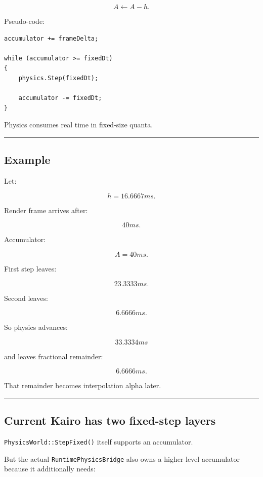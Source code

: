 \[
A\leftarrow A-h.
\]

Pseudo-code:

\begin{verbatim}
accumulator += frameDelta;

while (accumulator >= fixedDt)
{
    physics.Step(fixedDt);

    accumulator -= fixedDt;
}
\end{verbatim}

Physics consumes real time in fixed-size quanta.

\begin{center}\rule{0.5\linewidth}{0.5pt}\end{center}

\subsection{Example}\label{06-engine-ii-ch037-example}

Let:

\[
h=16.6667ms.
\]

Render frame arrives after:

\[
40ms.
\]

Accumulator:

\[
A=40ms.
\]

First step leaves:

\[
23.3333ms.
\]

Second leaves:

\[
6.6666ms.
\]

So physics advances:

\[
33.3334ms
\]

and leaves fractional remainder:

\[
6.6666ms.
\]

That remainder becomes interpolation alpha later.

\begin{center}\rule{0.5\linewidth}{0.5pt}\end{center}

\subsection{Current Kairo has two fixed-step layers}\label{06-engine-ii-ch037-current-kairo-has-two-fixed-step-layers}

\texttt{PhysicsWorld::StepFixed()} itself supports an accumulator.

But the actual \texttt{RuntimePhysicsBridge} also owns a higher-level accumulator because it additionally needs:

